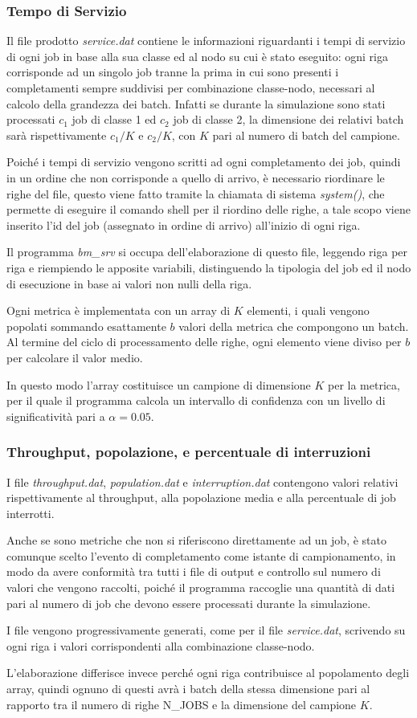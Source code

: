 \subsubsection{Tempo di Servizio} 
Il file prodotto \emph{service.dat} contiene le informazioni riguardanti i tempi
di servizio di ogni job in base alla sua classe ed al nodo su cui è stato
eseguito: ogni riga corrisponde ad un singolo job tranne la prima in cui sono
presenti i completamenti sempre suddivisi per combinazione classe-nodo,
necessari al calcolo della grandezza dei batch. Infatti se durante la
simulazione sono stati processati $c_1$ job di classe 1 ed $c_2$ job di classe
2, la dimensione dei relativi batch sarà rispettivamente $c_1/K$ e $c_2/K$, con
$K$ pari al numero di batch del campione.

Poiché i tempi di servizio vengono scritti ad ogni completamento dei job, quindi
in un ordine che non corrisponde a quello di arrivo, è necessario riordinare le
righe del file, questo viene fatto tramite la chiamata di sistema
\emph{system()}, che permette di eseguire il comando shell per il riordino delle
righe, a tale scopo viene inserito l’id del job (assegnato in ordine di arrivo)
all’inizio di ogni riga.

Il programma \emph{bm\_srv} si occupa dell’elaborazione di questo file, leggendo
riga per riga e riempiendo le apposite variabili, distinguendo la tipologia del
job ed il nodo di esecuzione in base ai valori non nulli della riga.

Ogni metrica è implementata con un array di $K$ elementi, i quali vengono
popolati sommando esattamente $b$ valori della metrica che compongono un batch.
Al termine del ciclo di processamento delle righe, ogni elemento viene diviso
per $b$ per calcolare il valor medio.

In questo modo l’array costituisce un campione di dimensione $K$ per la metrica,
per il quale il programma calcola un intervallo di confidenza con un livello di
significatività pari a $\alpha = 0.05$.
%
\subsubsection{Throughput, popolazione, e percentuale di interruzioni}
I file \emph{throughput.dat}, \emph{population.dat} e \emph{interruption.dat}
contengono valori relativi rispettivamente al throughput, alla popolazione media
e alla percentuale di job interrotti.

Anche se sono metriche che non si riferiscono direttamente ad un job, è stato
comunque scelto l’evento di completamento come istante di campionamento, in modo
da avere conformità tra tutti i file di output e controllo sul numero di valori
che vengono raccolti, poiché il programma raccoglie una quantità di dati pari al
numero di job che devono essere processati durante la simulazione.

I file vengono progressivamente generati, come per il file \emph{service.dat},
scrivendo su ogni riga i valori corrispondenti alla combinazione classe-nodo.

L’elaborazione differisce invece perché ogni riga contribuisce al popolamento
degli array, quindi ognuno di questi avrà i batch della stessa dimensione pari
al rapporto tra il numero di righe N\_JOBS e la dimensione del campione $K$.

